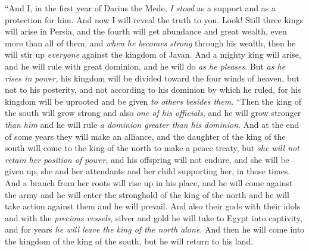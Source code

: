 \begin{biblechapter} %
 “And I, in the first year of Darius the Mede, \textit{I stood} as a support and as a protection for him.
\verse And now I will reveal the truth to you. Look! Still three kings will arise in Persia, and the fourth will get abundance and great wealth, even more than all of them, and \textit{when he becomes strong} through his wealth, then he will stir up \textit{everyone} against the kingdom of Javan.
\verse And a mighty king will arise, and he will rule with great dominion, and he will do \textit{as he pleases}.
\verse But \textit{as he rises in power}, his kingdom will be divided toward the four winds of heaven, but not to his posterity, and not according to his dominion by which he ruled, for his kingdom will be uprooted and be given \textit{to others besides them}.
\verse “Then the king of the south will grow strong and also \textit{one of his officials}, and he will grow stronger \textit{than him} and he will rule \textit{a dominion greater than his dominion}.
\verse And at the end of some years they will make an alliance, and the daughter of the king of the south will come to the king of the north to make a peace treaty, but \textit{she will not retain her position of power}, and his offspring will not endure, and she will be given up, she and her attendants and her child supporting her, in those times.
\verse And a branch from her roots will rise up in his place, and he will come against the army and he will enter the stronghold of the king of the north and he will take action against them and he will prevail.
\verse And also their gods with their idols and with the \textit{precious vessels}, silver and gold he will take to Egypt into captivity, and for years \textit{he will leave the king of the north alone}.
\verse And then he will come into the kingdom of the king of the south, but he will return to his land.

\end{biblechapter}
